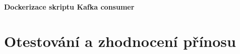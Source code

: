 \documentclass[thesis=M,czech,hidelinks]{FITthesis}[2013/05/06]
\begin{document}
\subsubsection{Dockerizace skriptu Kafka consumer}













\chapter{Otestování a zhodnocení přínosu}














 \setlength{\parskip}{10pt}

\begin{conclusion}

\end{conclusion}
\end{document}
